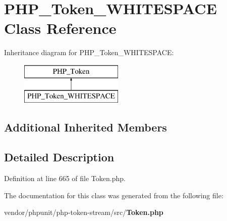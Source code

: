 \section{P\+H\+P\+\_\+\+Token\+\_\+\+W\+H\+I\+T\+E\+S\+P\+A\+C\+E Class Reference}
\label{class_p_h_p___token___w_h_i_t_e_s_p_a_c_e}
Inheritance diagram for P\+H\+P\+\_\+\+Token\+\_\+\+W\+H\+I\+T\+E\+S\+P\+A\+C\+E\+:\begin{figure}[H]
\begin{center}
\leavevmode
\includegraphics[height=2.000000cm]{class_p_h_p___token___w_h_i_t_e_s_p_a_c_e}
\end{center}
\end{figure}
\subsection*{Additional Inherited Members}


\subsection{Detailed Description}


Definition at line 665 of file Token.\+php.



The documentation for this class was generated from the following file\+:\begin{DoxyCompactItemize}
\item 
vendor/phpunit/php-\/token-\/stream/src/{\bf Token.\+php}\end{DoxyCompactItemize}
